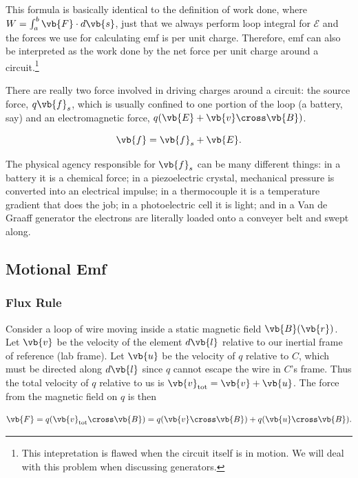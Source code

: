 \documentclass[english,a4paper,12pt]{report}
\begin{document}
This formula is basically identical to the definition of work done, where \(W = \int_{a}^{b} \vb{F} \cdot d \vb{s}  \), just that we always perform loop integral for \(\mathcal{E}\) and the forces we use for calculating emf is per unit charge. Therefore, emf can also be interpreted as the work done by the net force per unit charge around a circuit.\footnote{This intepretation is flawed when the circuit itself is in motion. We will deal with this problem when discussing generators.}

There are really two force involved in driving charges around a circuit: the source force, \(q \vb{f} _{s}  \), which is usually confined to one portion of the loop (a battery, say) and an electromagnetic force, \(q(\vb{E} + \vb{v} \cross \vb{B} ) \).

\begin{equation}
    \vb{f} = \vb{f} _{s} + \vb{E} . 
\end{equation}

The physical agency responsible for \(\vb{f} _{s} \)  can be many different things: in a battery it is a chemical force; in a piezoelectric crystal, mechanical pressure is converted into an electrical impulse; in a thermocouple it is a temperature gradient that does the job; in a photoelectric cell it is light; and in a Van de Graaff generator the electrons are literally loaded onto a conveyer belt and swept along. 

\subsection{Motional Emf}
\subsubsection{Flux Rule}
Consider a loop of wire moving inside a static magnetic field \(\vb{B} (\vb{r} )\). Let \(\vb{v} \) be the velocity of the element \(d \vb{l} \) relative to our inertial frame of reference (lab frame). Let \(\vb{u}\) be the velocity of \(q\) relative to \(C\), which must be directed along \(d \vb{l} \) since \(q\) cannot escape the wire in \(C\)'s frame. Thus the total velocity of \(q\) relative to us is \(\vb{v} _{\text{tot} } = \vb{v} + \vb{u} \). The force from the magnetic field on \(q\) is then

\begin{equation}
    \vb{F} = q(\vb{v} _{\text{tot} } \cross \vb{B} ) = q (\vb{v} \cross \vb{B} ) + q (\vb{u} \cross \vb{B} ).
\end{equation}
\end{document}
